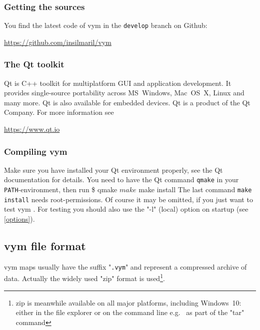 \documentclass[12pt,a4paper]{article}
\newcommand{\vym}{{\sc vym }}
\newenvironment{code}[1] { \verbatim #1}{\endverbatim  }
\begin{document}
\begin{appendix}
\subsubsection{Getting the sources} \label{getsources}
You find the latest code of \vym in the {\tt develop} branch on Github:
\begin{center}
    \href{ https://github.com/insilmaril/vym}{https://github.com/insilmaril/vym}
\end{center}

\subsubsection{The Qt toolkit}
Qt is C++ toolkit for multiplatform GUI and application development. It
provides single-source portability across MS~Windows, Mac~OS~X, Linux
and many more. Qt is also available for
embedded devices. Qt is a product of the Qt Company. For more information see
\begin{center} 
    \href{https://www.qt.io}{https://www.qt.io} 
\end{center}



\subsubsection{Compiling \vym }
Make sure you have installed your Qt environment properly, see the Qt
documentation for details. You need to have the Qt command {\tt qmake}
in your {\tt PATH}-environment, then run
\begin{code}
\$ qmake
$ make  
$ make install
\end{code}
The last command {\tt make install} needs root-permissions. Of course it
may be omitted, if you just want to test \vym. For testing you should
also use the "-l" (local) option on startup (see \ref{options}).


\subsection{\vym file format} \label{fileformat}
\vym maps usually have the suffix "{\tt .vym}" and represent a
compressed archive of data. Actually the widely used "zip" format
is used\footnote{zip is meanwhile available on all major platforms,
including Windows~10: either in the file explorer or on the command line
e.g.~ as part of the "tar" command}.


\end{appendix}
\end{document}
